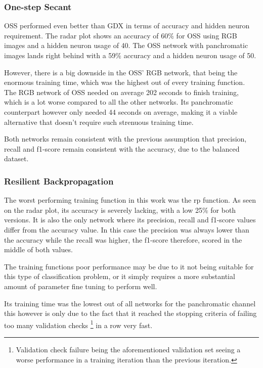 \subsubsection{One-step Secant}
OSS performed even better than GDX in terms of accuracy and hidden neuron requirement. The radar plot shows an accuracy of 60\% for OSS using RGB images and a hidden neuron usage of 40. The OSS network with panchromatic images lands right behind with a 59\% accuracy and a hidden neuron usage of 50.

However, there is a big downside in the OSS' RGB network, that being the enormous training time, which was the highest out of every training function. The RGB network of OSS needed on average 202 seconds to finish training, which is a lot worse compared to all the other networks. Its panchromatic counterpart however only needed 44 seconds on average, making it a viable alternative that doesn't require such strenuous training time.

Both networks remain consistent with the previous assumption that precision, recall and f1-score remain consistent with the accuracy, due to the balanced dataset.

\subsubsection{Resilient Backpropagation}
The worst performing training function in this work was the rp function. As seen on the radar plot, its accuracy is severely lacking, with a low 25\% for both versions. It is also the only network where its precision, recall and f1-score values differ from the accuracy value. In this case the precision was always lower than the accuracy while the recall was higher, the f1-score therefore, scored in the middle of both values.

The training functions poor performance may be due to it not being suitable for this type of classification problem, or it simply requires a more substantial amount of parameter fine tuning to perform well.

Its training time was the lowest out of all networks for the panchromatic channel this however is only due to the fact that it reached the stopping criteria of failing too many validation checks \footnote{Validation check failure being the aforementioned validation set seeing a worse performance in a training iteration than the previous iteration.} in a row very fast.

